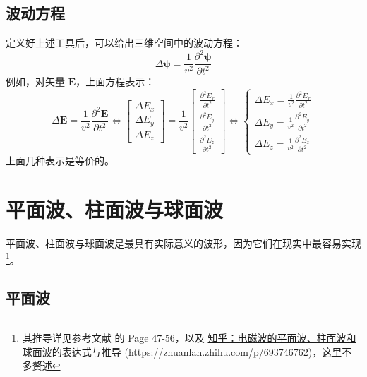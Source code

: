 \documentclass[UTF8]{report}
\theoremstyle{MyLineTheoremStyle} %
\theoremstyle{MyBlockTheoremStyle} %
\theoremstyle{MySubsubsectionStyle} %
\begin{document}
\subsection{波动方程}

定义好上述工具后，可以给出三维空间中的波动方程：
\begin{equation}
    \Delta \boldsymbol{\psi} =\frac{1}{v^{2}}\frac{\partial^{2}\boldsymbol{\psi}}{\partial t^{2}}
\end{equation}
例如，对矢量 $\boldsymbol{E}$，上面方程表示：
\begin{equation}
    \Delta \boldsymbol{E} =\frac{1}{v^{2}}\frac{\partial^{2}\boldsymbol{E}}{\partial t^{2}} 
    \Longleftrightarrow 
    \begin{bmatrix}
        \Delta E_x \\ 
        \Delta E_y \\
        \Delta E_z
    \end{bmatrix} = 
    \frac{1}{v^{2}}
    \begin{bmatrix}
        \frac{\partial^{2}E_x}{\partial t^{2}} \\ 
        \frac{\partial^{2}E_y}{\partial t^{2}} \\
        \frac{\partial^{2}E_z}{\partial t^{2}}
    \end{bmatrix} 
    \Longleftrightarrow
    \begin{cases}
        \Delta E_x =\frac{1}{v^{2}}\frac{\partial^{2}E_x}{\partial t^{2}}\\
        \Delta E_y =\frac{1}{v^{2}}\frac{\partial^{2}E_y}{\partial t^{2}}\\
        \Delta E_z =\frac{1}{v^{2}}\frac{\partial^{2}E_z}{\partial t^{2}}
    \end{cases}
\end{equation}
上面几种表示是等价的。


\section{平面波、柱面波与球面波}\label{平面波、柱面波与球面波}

平面波、柱面波与球面波是最具有实际意义的波形，因为它们在现实中最容易实现\footnote{其推导详见参考文献 \cite{Optics} 的 Page 47-56，以及 \href{https://zhuanlan.zhihu.com/p/693746762}{知乎：电磁波的平面波、柱面波和球面波的表达式与推导 (https://zhuanlan.zhihu.com/p/693746762)}，这里不多赘述}。

\subsection{平面波}
\end{document}
